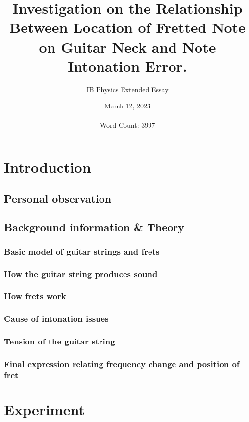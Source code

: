 \documentclass[12pt]{article}
\title{Investigation on the Relationship Between Location of Fretted Note on Guitar Neck and Note Intonation Error.}
\author{IB Physics Extended Essay}
\date{March 12, 2023 \\~\\\tiny Word Count: 3997}
\begin{document}
    \maketitle
    \newpage
    \tableofcontents
    \newpage
    \begin{flushleft}
        \section{Introduction}
            \subsection{Personal observation}
                
            \subsection{Background information \& Theory}
                \subsubsection*{Basic model of guitar strings and frets}
                    
                \subsubsection*{How the guitar string produces sound}
                    
                \subsubsection*{How frets work}
                    
                \subsubsection*{Cause of intonation issues}
                    
                \subsubsection*{Tension of the guitar string}
                    
                \subsubsection*{Final expression relating frequency change and position of fret}
                    
        \section{Experiment}
            

\end{flushleft}
\end{document}

